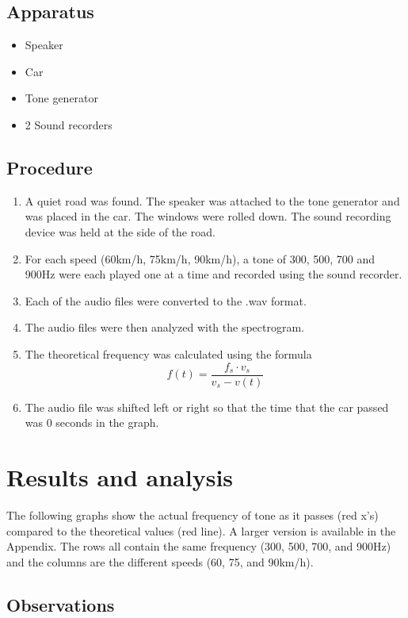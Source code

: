 \documentclass[12pt]{article}
\begin{document}
\subsection{Apparatus}

\begin{itemize}
    \item Speaker
    \item Car
    \item Tone generator
    \item 2 Sound recorders
\end{itemize}

\subsection{Procedure}

\begin{enumerate}
    \item A quiet road was found. The speaker was attached to the tone generator and
    was placed in the car. The windows were rolled down. The sound recording device
    was held at the side of the road.
    \item For each speed (60km/h, 75km/h, 90km/h), a tone of 300, 500, 700 and 900Hz were each played one at a time and recorded using the sound recorder.
    
    \item Each of the audio files were converted to the .wav format.
    \item The audio files were then analyzed with the spectrogram.
    \item The theoretical frequency was calculated using the formula $$ f(t) = \frac{f_s \cdot v_s}{ v_s - v(t) }$$
    \item The audio file was shifted left or right so that the time that the car passed was 0 seconds in the graph.
\end{enumerate}

\section{Results and analysis}

The following graphs show the actual frequency of tone as it passes (red x's) compared to the theoretical values (red line). A larger version is available in the Appendix. The rows all contain the same frequency (300, 500, 700, and 900Hz) and the columns are the different speeds (60, 75, and 90km/h).

\subsection{Observations}
\end{document}
